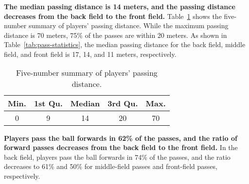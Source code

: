 \textbf{The median passing distance is 14 meters, and the passing distance decreases from the back field to the front field.}
Table~\ref{tab:pass-dist} shows the five-number summary of players' passing distance. While the maximum passing distance is 70 meters, 75\% of the passes are within 20 meters. %
As shown in Table~\ref{tab:pass-statistics}, the median passing distance for the back field, middle field, and front field is 17, 14, and 11 meters, respectively.

\begin{table}[!t]
\caption{Five-number summary of players' passing distance.}
\centering
\renewcommand{\tabcolsep}{3pt}
\begin{tabular}{c c c c c}
\toprule
Min. & 1st Qu. & Median & 3rd Qu. & Max. \\
\midrule
0 & 9 & 14 & 20 & 70 \\
\bottomrule
\end{tabular}
\label{tab:pass-dist}
\end{table}

\textbf{Players pass the ball forwards in 62\% of the passes, and the ratio of forward passes decreases from the back field to the front field.} In the back field, players pass the ball forwards in 74\% of the passes, and the ratio decreases to 61\% and 50\% for middle-field passes and front-field passes, respectively.


